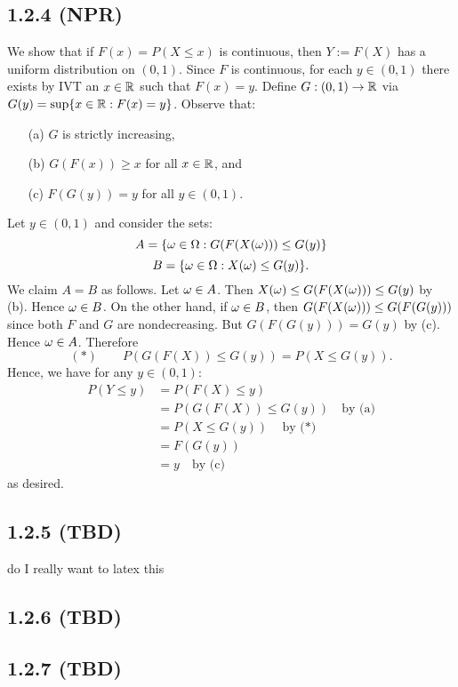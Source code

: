 \documentclass[11pt]{article}
\begin{document}
\subsection*{1.2.4 (NPR)}

We show that if $F(x) = P(X\leq x)$ is continuous, then $Y := F(X)$ has a uniform distribution on $(0,1)$. Since $F$ is continuous, for each $y \in (0,1)$ there exists by IVT an $x \in {\mathbb R}$ such that $F(x) = y$. Define $G:(0,1) \to {\mathbb R}$ via $G(y) = \sup \{x \in {\mathbb R} : F(x) = y\}$. Observe that: \begin{enumerate}
    \item[(a)] $G$ is strictly increasing, 
    \item[(b)] $G(F(x)) \geq x$ for all $x \in {\mathbb R}$, and 
    \item[(c)] $F(G(y)) = y$ for all $y \in (0,1)$. \end{enumerate}
    
    Let $y \in (0,1)$ and consider the sets: \[A = \{\omega \in \Omega : G(F(X(\omega))) \leq G(y)\}\]\[B = \{\omega \in \Omega : X(\omega) \leq G(y)\}.\] We claim $A = B$ as follows. Let $\omega \in A$. Then $X(\omega) \leq G(F(X(\omega))) \leq G(y)$ by (b). Hence $\omega \in B$. On the other hand, if $\omega \in B$, then $G(F(X(\omega))) \leq G(F(G(y)))$ since both $F$ and $G$ are nondecreasing. But $G(F(G(y))) = G(y)$ by (c). Hence $\omega \in A$. Therefore \[(*) \quad\quad P(G(F(X)) \leq G(y)) = P(X \leq G(y)). \] Hence, we have for any $y \in (0,1)$:\begin{align*}
    P(Y \leq y) &= P(F(X) \leq y)\\
    &= P(G(F(X)) \leq G(y)) \quad \text{by (a)} \\
    &= P(X \leq G(y))\quad \text{by ($*$)}\\
    &= F(G(y)) \\
    &= y \quad \text{by (c)}
\end{align*} as desired.

\subsection*{1.2.5 (TBD)}

do I really want to latex this 

\subsection*{1.2.6 (TBD)}

\subsection*{1.2.7 (TBD)}
\end{document}
